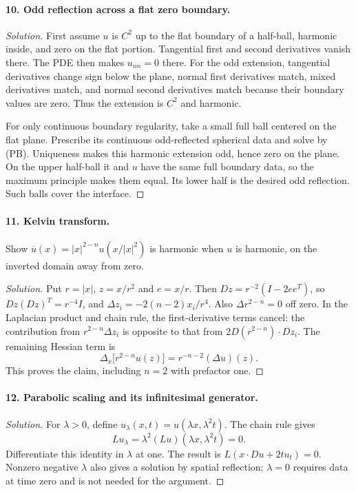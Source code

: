 \paragraph{10. Odd reflection across a flat zero boundary.}
\begin{proof}[Solution]
First assume $u$ is $C^2$ up to the flat boundary of a half-ball,
harmonic inside, and zero on the flat portion.
Tangential first and second derivatives vanish there.
The PDE then makes $u_{nn}=0$ there.
For the odd extension, tangential derivatives change sign below the
plane, normal first derivatives match, mixed derivatives match, and
normal second derivatives match because their boundary values are zero.
Thus the extension is $C^2$ and harmonic.

For only continuous boundary regularity, take a small full ball centered
on the flat plane. Prescribe its continuous odd-reflected spherical data
and solve by (PB). Uniqueness makes this harmonic extension odd,
hence zero on the plane. On the upper half-ball it and $u$ have the
same full boundary data, so the maximum principle makes them equal.
Its lower half is the desired odd reflection. Such balls cover the interface.
\end{proof}
\Needspace{45mm}

\paragraph{11. Kelvin transform.}
Show $\overline u(x)=|x|^{2-n}u(x/|x|^2)$ is harmonic when $u$ is harmonic,
on the inverted domain away from zero.
\begin{proof}[Solution]
Put $r=|x|$, $z=x/r^2$ and $e=x/r$.
Then $Dz=r^{-2}(I-2ee^T)$, so $Dz(Dz)^T=r^{-4}I$,
and $\Delta z_i=-2(n-2)x_i/r^4$.
Also $\Delta r^{2-n}=0$ off zero.
In the Laplacian product and chain rule, the first-derivative terms cancel:
the contribution from $r^{2-n}\Delta z_i$ is opposite to that from
$2D(r^{2-n})\cdot Dz_i$. The remaining Hessian term is
\[
 \Delta_x\big[r^{2-n}u(z)\big]=r^{-n-2}(\Delta u)(z).
\]
This proves the claim, including $n=2$ with prefactor one.
\end{proof}

\paragraph{12. Parabolic scaling and its infinitesimal generator.}
\begin{proof}[Solution]
For $\lambda>0$, define $u_\lambda(x,t)=u(\lambda x,\lambda^2t)$. The chain rule gives
\[
 Lu_\lambda=\lambda^2(Lu)(\lambda x,\lambda^2t)=0.
\]
Differentiate this identity in $\lambda$ at one.
The result is $L(x\cdot Du+2tu_t)=0$.
Nonzero negative $\lambda$ also gives a solution by spatial reflection;
$\lambda=0$ requires data at time zero and is not needed for the argument.
\end{proof}

